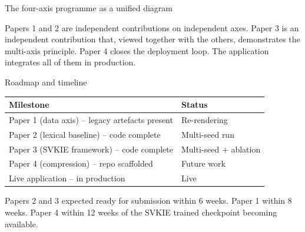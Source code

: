 \documentclass{beamer}
\begin{document}
\begin{frame}{The four-axis programme as a unified diagram}
  \begin{center}
  \end{center}
  \vspace{0.5em}
  Papers 1 and 2 are independent contributions on independent axes.
  Paper 3 is an independent contribution that, viewed together with the
  others, demonstrates the multi-axis principle.  Paper 4 closes the
  deployment loop.  The application integrates all of them in
  production.
\end{frame}

\begin{frame}{Roadmap and timeline}
  \begin{center}
  \small
  \begin{tabular}{ll}
    \toprule
    Milestone & Status \\ \midrule
    Paper 1 (data axis) -- legacy artefacts present       & Re-rendering \\
    Paper 2 (lexical baseline) -- code complete           & Multi-seed run \\
    Paper 3 (SVKIE framework) -- code complete            & Multi-seed + ablation \\
    Paper 4 (compression) -- repo scaffolded              & Future work \\
    Live application -- in production                     & Live \\
    \bottomrule
  \end{tabular}
  \end{center}
  \vspace{0.5em}
  Papers 2 and 3 expected ready for submission within 6 weeks.
  Paper 1 within 8 weeks.  Paper 4 within 12 weeks of the SVKIE
  trained checkpoint becoming available.
\end{frame}
\end{document}
